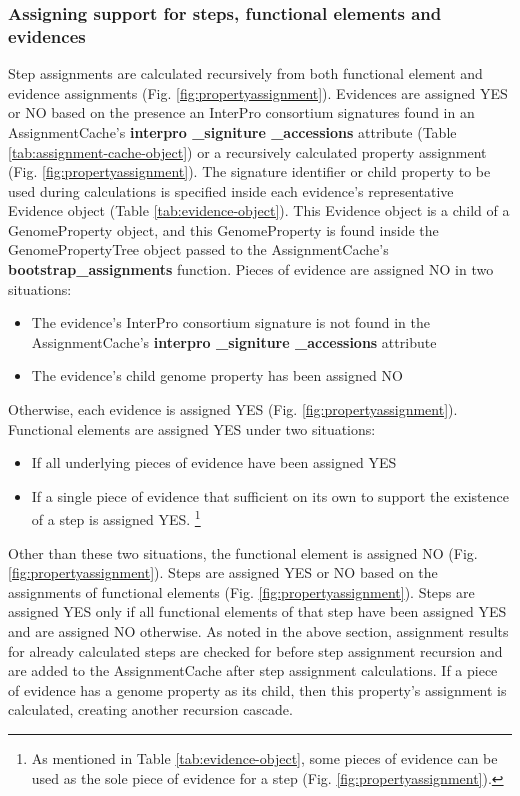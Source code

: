 \subsubsection{Assigning support for steps, functional elements and evidences}

Step assignments are calculated recursively from both functional element and evidence assignments (Fig. \ref{fig:propertyassignment}). Evidences are assigned YES or NO based on the presence an InterPro consortium signatures found in an AssignmentCache's \textbf{interpro \_signiture \_accessions} attribute (Table \ref{tab:assignment-cache-object}) or a recursively calculated property assignment (Fig. \ref{fig:propertyassignment}). The signature identifier or child property to be used during calculations is specified inside each evidence's representative Evidence object (Table \ref{tab:evidence-object}). This Evidence object is a child of a GenomeProperty object, and this GenomeProperty is found inside the GenomePropertyTree object passed to the AssignmentCache's \textbf{bootstrap\_assignments} function. Pieces of evidence are assigned NO in two situations: 
\begin{itemize}
\item The evidence's InterPro consortium signature is not found in the AssignmentCache's \textbf{interpro \_signiture \_accessions} attribute 
\item The evidence's child genome property has been assigned NO 
\end{itemize}
Otherwise, each evidence is assigned YES (Fig. \ref{fig:propertyassignment}). Functional elements are assigned YES under two situations: 
\begin{itemize}
\item If all underlying pieces of evidence have been assigned YES
\item If a single piece of evidence that sufficient on its own to support the existence of a step is assigned YES. \footnote{As mentioned in Table \ref{tab:evidence-object}, some pieces of evidence can be used as the sole piece of evidence for a step (Fig. \ref{fig:propertyassignment}).}
\end{itemize}
Other than these two situations, the functional element is assigned NO (Fig. \ref{fig:propertyassignment}). Steps are assigned YES or NO based on the assignments of functional elements (Fig. \ref{fig:propertyassignment}). Steps are assigned YES only if all functional elements of that step have been assigned YES and are assigned NO otherwise. As noted in the above section, assignment results for already calculated steps are checked for before step assignment recursion and are added to the AssignmentCache after step assignment calculations. If a piece of evidence has a genome property as its child, then this property's assignment is calculated, creating another recursion cascade.

